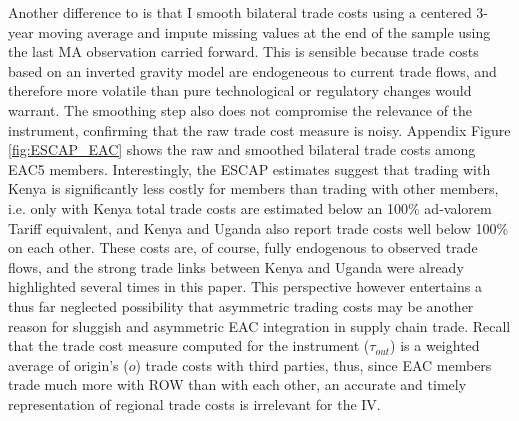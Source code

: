 \documentclass[a4paper]{article}
\begin{document}
Another difference to \citet{Kummritz20161} is that I smooth bilateral trade costs using a centered 3-year moving average and impute missing values at the end of the sample using the last MA observation carried forward. This is sensible because trade costs based on an inverted gravity model are endogeneous to current trade flows, and therefore more volatile than pure technological or regulatory changes would warrant. The smoothing step also does not compromise the relevance of the instrument, confirming that the raw trade cost measure is noisy. Appendix Figure \ref{fig:ESCAP_EAC} shows the raw and smoothed bilateral trade costs among EAC5 members. Interestingly, the   ESCAP estimates suggest that trading with Kenya is significantly less costly for members than trading with other members, i.e. only with Kenya total trade costs are estimated below an 100\% ad-valorem Tariff equivalent, and Kenya and Uganda also report trade costs well below 100\% on each other. These costs are, of course, fully endogenous to observed trade flows, and the strong trade links between Kenya and Uganda were already highlighted several times in this paper. This perspective however entertains a thus far neglected possibility that asymmetric trading costs may be another reason for sluggish and asymmetric EAC integration in supply chain trade. Recall that the trade cost measure computed for the instrument ($\tau_{out}$) is a weighted average of origin's ($o$) trade costs with third parties, thus, since EAC members trade much more with ROW than with each other, an accurate and timely representation of regional trade costs is irrelevant for the IV. \newline
\end{document}
